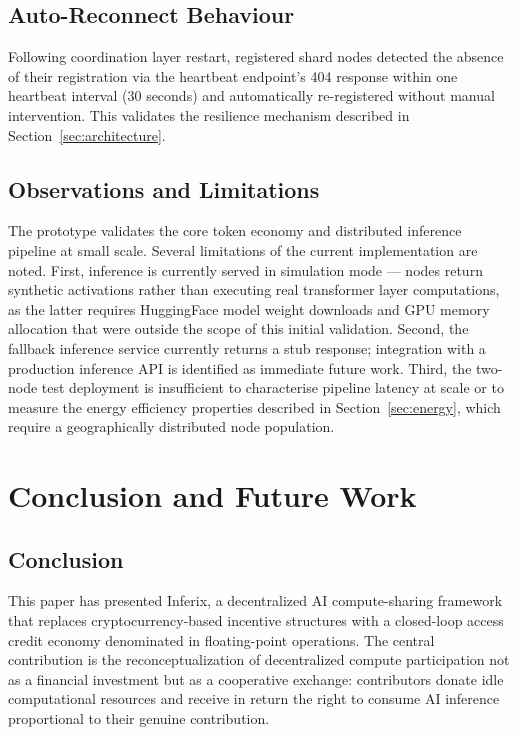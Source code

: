 \documentclass[12pt]{article}
\begin{document}
\subsection{Auto-Reconnect Behaviour}

Following coordination layer restart, registered shard nodes detected the absence of their registration via the heartbeat endpoint's 404 response within one heartbeat interval (30 seconds) and automatically re-registered without manual intervention. This validates the resilience mechanism described in Section~\ref{sec:architecture}.

\subsection{Observations and Limitations}

The prototype validates the core token economy and distributed inference pipeline at small scale. Several limitations of the current implementation are noted. First, inference is currently served in simulation mode — nodes return synthetic activations rather than executing real transformer layer computations, as the latter requires HuggingFace model weight downloads and GPU memory allocation that were outside the scope of this initial validation. Second, the fallback inference service currently returns a stub response; integration with a production inference API is identified as immediate future work. Third, the two-node test deployment is insufficient to characterise pipeline latency at scale or to measure the energy efficiency properties described in Section~\ref{sec:energy}, which require a geographically distributed node population.

\section{Conclusion and Future Work}
\label{sec:conclusion}

\subsection{Conclusion}

This paper has presented Inferix, a decentralized AI compute-sharing framework that replaces cryptocurrency-based incentive structures with a closed-loop access credit economy denominated in floating-point operations. The central contribution is the reconceptualization of decentralized compute participation not as a financial investment but as a cooperative exchange: contributors donate idle computational resources and receive in return the right to consume AI inference proportional to their genuine contribution.
\end{document}
